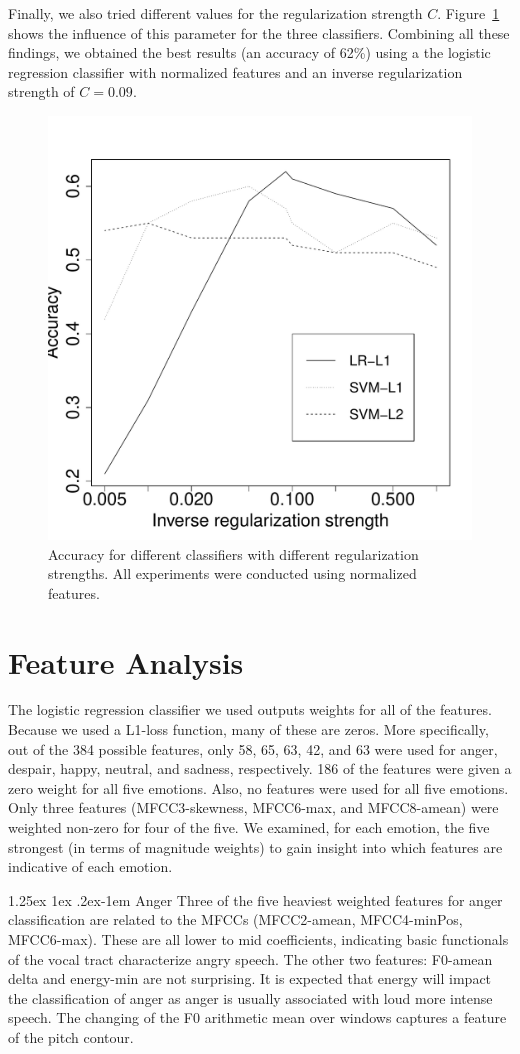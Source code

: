 \documentclass[twocolumn, 11pt]{article}
\makeatletter
\renewcommand{\paragraph}{%
  \@startsection{paragraph}{4}%
  {\z@}{1.25ex \@plus 1ex \@minus .2ex}{-1em}%
  {\normalfont\normalsize\bfseries}%
}
\makeatother
\begin{document}
Finally, we also tried different values for the regularization strength $C$. Figure~\ref{fig:reg_strength} shows
the influence of this parameter for the three classifiers. 
Combining all these findings, we obtained the best results (an accuracy of 62\%)
using a the logistic regression classifier with normalized features and an inverse regularization
strength of $C=0.09$.

\begin{figure}[h]\centering
    \includegraphics[width=0.7\columnwidth]{reg_strength.pdf}
    \caption{\label{fig:reg_strength} Accuracy for different classifiers with different regularization strengths. All experiments
    were conducted using normalized features.}
\end{figure}

\section{Feature Analysis}
The logistic regression classifier we used outputs weights for all of the features. Because we used a L1-loss function, many of these are zeros. More specifically, out of the 384 possible features, only 58, 65, 63, 42, and 63 were used for anger, despair, happy, neutral, and sadness, respectively. 186 of the features were given a zero weight for all five emotions. Also, no features were used for all five emotions. Only three features (MFCC3-skewness, MFCC6-max, and MFCC8-amean) were weighted non-zero for four of the five. We examined, for each emotion, the five strongest (in terms of magnitude weights) to gain insight into which features are indicative of each emotion.

\paragraph{Anger} Three of the five heaviest weighted features for anger classification are related to the MFCCs  (MFCC2-amean,  MFCC4-minPos, MFCC6-max). These are all lower to mid coefficients, indicating basic functionals of the vocal tract characterize angry speech. The other two features: F0-amean delta and energy-min are not surprising. It is expected that energy will impact the classification of anger as anger is usually associated with loud more intense speech. The changing of the F0 arithmetic mean over windows captures a feature of the pitch contour.
\end{document}
